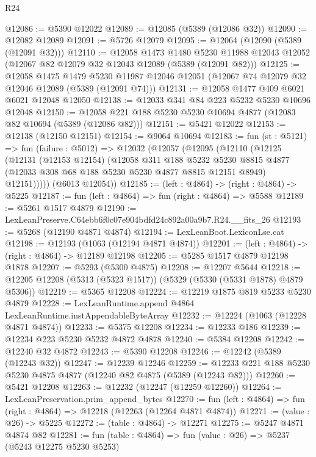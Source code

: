 \begin{lexlean}{R24}
\begin{coremodule}
@12086 := @5390 @12022
@12089 := @12085 (@5389 (@12086 @32))
@12090 := @12082 @12089
@12091 := @5726 @12079
@12095 := @12064 (@12090 (@5389 (@12091 @32)))
@12110 := @12058
    @1473
    @1480
    @5230
    @11988
    @12043
    @12052
    (@12067 @82 @12079 @32 @12043 @12089 (@5389 (@12091 @82)))
@12125 := @12058
    @1475
    @1479
    @5230
    @11987
    @12046
    @12051
    (@12067 @74 @12079 @32 @12046 @12089 (@5389 (@12091 @74)))
@12131 := @12058 @1477 @409 @6021 @6021 @12048 @12050
@12138 := @12033 @341 @84 @223 @5232 @5230 @10696 @12048
@12150 := @12058 @221 @188 @5230 @5230 @10694 @4877 (@12083 @82 @10694 (@5389 (@12086 @82)))
@12151 := @5421 @12022
@12153 := @12138 (@12150 @12151)
@12154 := @9064 @10694
@12183 := fun (st : @5121) =>
  fun (failure : @5012) =>
  @12032
    (@12057
      (@12095
        (@12110
          (@12125
            (@12131
              (@12153 @12154)
              (@12058
                @311
                @188
                @5232
                @5230
                @8815
                @4877
                (@12033 @308 @68 @188 @5230 @5230 @4877 @8815 @12151 @8949)
                @12151)))))
      (@6013 @12054))
@12185 := (left : @4864) -> (right : @4864) -> @5225
@12187 := fun (left : @4864) => fun (right : @4864) => @5588
@12189 := @5261 @1517 @4879
@12190 := LexLeanPreserve.C64ebb6f0c07e904bdfd24c892a00a9b7.R24.__fits_26
@12193 := @5268 (@12190 @4871 @4874)
@12194 := LexLeanBoot.LexiconLse.cat
@12198 := @12193 (@1063 (@12194 @4871 @4874))
@12201 := (left : @4864) -> (right : @4864) -> @12189 @12198
@12205 := @5285 @1517 @4879 @12198 @1878
@12207 := @5293 (@5300 @4875)
@12208 := @12207 @5644
@12218 := @12205 @12208 (@5313 (@5323 @1517)) (@5329 (@5330 (@5331 @1878) @4879 @5306))
@12219 := @5365 @12208
@12224 := @12219 @1875 @819 @5233 @5230 @4879
@12228 := LexLeanRuntime.append @4864 LexLeanRuntime.instAppendableByteArray
@12232 := @12224 (@1063 (@12228 @4871 @4874))
@12233 := @5375 @12208
@12234 := @12233 @186
@12239 := @12234 @223 @5230 @5232 @4872 @4878
@12240 := @5384 @12208
@12242 := @12240 @32 @4872
@12243 := @5390 @12208
@12246 := @12242 (@5389 (@12243 @32))
@12247 := @12239 @12246
@12259 := @12233 @221 @188 @5230 @5230 @4875 @4877 (@12240 @82 @4875 (@5389 (@12243 @82)))
@12260 := @5421 @12208
@12263 := @12232 (@12247 (@12259 @12260))
@12264 := LexLeanPreservation.prim_append_bytes
@12270 := fun (left : @4864) => fun (right : @4864) => @12218 (@12263 (@12264 @4871 @4874))
@12271 := (value : @26) -> @5225
@12272 := (table : @4864) -> @12271
@12275 := @5247 @4871 @4874 @82
@12281 := fun (table : @4864) => fun (value : @26) => @5237 (@5243 @12275 @5230 @5253)

\end{coremodule}
\end{lexlean}
